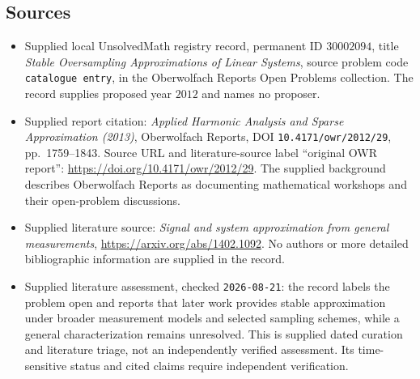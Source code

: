 \documentclass[11pt]{article}
\begin{document}
\subsection{Sources}
\begin{itemize}
\item Supplied local UnsolvedMath registry record, permanent ID \(30002094\), title \emph{Stable Oversampling Approximations of Linear Systems}, source problem code \texttt{catalogue entry}, in the Oberwolfach Reports Open Problems collection. The record supplies proposed year \(2012\) and names no proposer.
\item Supplied report citation: \emph{Applied Harmonic Analysis and Sparse Approximation (2013)}, Oberwolfach Reports, DOI \texttt{10.4171/owr/2012/29}, pp.~1759--1843. Source URL and literature-source label ``original OWR report'': \url{https://doi.org/10.4171/owr/2012/29}. The supplied background describes Oberwolfach Reports as documenting mathematical workshops and their open-problem discussions.
\item Supplied literature source: \emph{Signal and system approximation from general measurements}, \url{https://arxiv.org/abs/1402.1092}. No authors or more detailed bibliographic information are supplied in the record.
\item Supplied literature assessment, checked \texttt{2026-08-21}: the record labels the problem open and reports that later work provides stable approximation under broader measurement models and selected sampling schemes, while a general characterization remains unresolved. This is supplied dated curation and literature triage, not an independently verified assessment. Its time-sensitive status and cited claims require independent verification.
\end{itemize}
\end{document}
